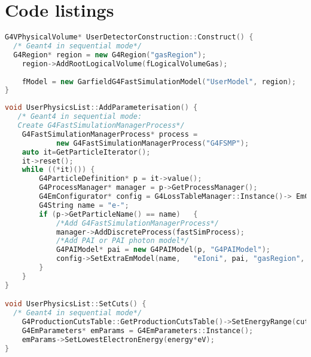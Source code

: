 \documentclass[preprint,12pt,sort&compress]{elsarticle}
\begin{document}
\newpage
\appendix
\section{Code listings}
\label{app:codelistings}


  
\begin{lstlisting}[label=code_G4Region,caption=G4Region implementation in the G4VUserDetectorConstruction class in Geant4 sequential mode.,language=C++]
G4VPhysicalVolume* UserDetectorConstruction::Construct() {
  /* Geant4 in sequential mode*/
  G4Region* region = new G4Region("gasRegion");
	region->AddRootLogicalVolume(fLogicalVolumeGas);
	
	fModel = new GarfieldG4FastSimulationModel("UserModel", region);
}
\end{lstlisting}

\newpage

\begin{lstlisting}[label=code_AddParameterisation,
language=C++,directivestyle={\color{black}}
emph={int,char,double,float,unsigned},
emphstyle={\color{blue}},caption={Instantiation of the G4FastSimulationManagerProcess in a physics list in sequential Geant4. The code shows how to enable the PAI model and the Geant4/Garfield++ interface. From Geant4 10.2 on, the PAI model may be enabled via UI command instead, however this code will still work.}]
void UserPhysicsList::AddParameterisation() {
   /* Geant4 in sequential mode: 
   Create G4FastSimulationManagerProcess*/
	G4FastSimulationManagerProcess* process = 
			new G4FastSimulationManagerProcess("G4FSMP");
	auto it=GetParticleIterator();
	it->reset();
	while ((*it)()) {
		G4ParticleDefinition* p = it->value();
		G4ProcessManager* manager = p->GetProcessManager();
		G4EmConfigurator* config = G4LossTableManager::Instance()->	EmConfigurator();
		G4String name = "e-";
		if (p->GetParticleName() == name) 	{
			/*Add G4FastSimulationManagerProcess*/
			manager->AddDiscreteProcess(fastSimProcess);
			/*Add PAI or PAI photon model*/
			G4PAIModel* pai = new G4PAIModel(p, "G4PAIModel");
			config->SetExtraEmModel(name, 	"eIoni", pai, "gasRegion", 0.*eV, 1.*TeV, pai);
		}
	}
}

void UserPhysicsList::SetCuts() {
  /* Geant4 in sequential mode*/
	G4ProductionCutsTable::GetProductionCutsTable()->SetEnergyRange(cut*eV, 1.*TeV);
	G4EmParameters* emParams = G4EmParameters::Instance();
	emParams->SetLowestElectronEnergy(energy*eV);
}
\end{lstlisting}
\end{document}

